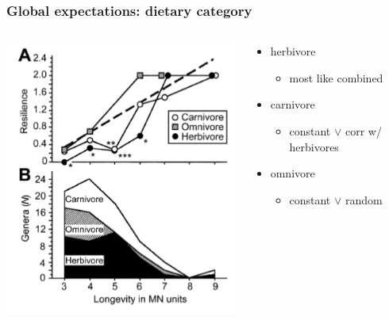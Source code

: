 \documentclass{beamer}
\begin{document}
\begin{frame}
  \frametitle{Global expectations: dietary category}

  \begin{columns}
    \begin{column}{0.6\textwidth}
      \includegraphics[height=0.7\textheight,width=\textwidth,keepaspectratio=true]{figure/jernvall}

      \tiny{}
    \end{column}
    \begin{column}{0.4\textwidth}
      \begin{itemize}
        \item herbivore
          \begin{itemize}
            \item most like combined
          \end{itemize}
        \item carnivore
          \begin{itemize}
            \item constant \(\lor\) corr w/ herbivores
          \end{itemize}
        \item omnivore
          \begin{itemize}
            \item constant \(\lor\) random
          \end{itemize}
      \end{itemize}
    \end{column}
  \end{columns}
\end{frame}
\end{document}
